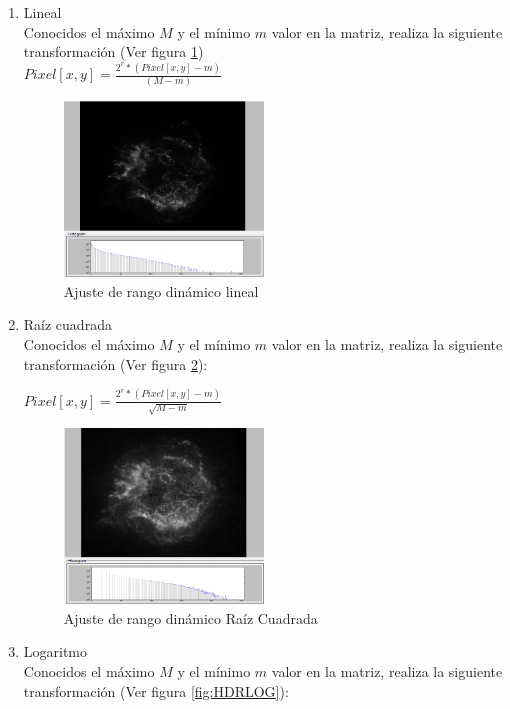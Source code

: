 	\begin{enumerate}
		\item Lineal\\
		Conocidos el máximo $M$ y el mínimo $m$ valor en la matriz, realiza
		la siguiente transformación (Ver figura \ref{fig:HDRLineal})\\
		
			$Pixel[x,y]=\frac{2^{r}*(Pixel[x,y]-m)}{(M-m)}$
			\begin{figure}[!htb]
				\centering
				\includegraphics[width=0.5\textwidth]{images/HDREQ/chandraLineal.PNG}
				\caption{\label{fig:HDRLineal}Ajuste de rango dinámico lineal}
			\end{figure}
		\item Raíz cuadrada\\
		Conocidos el máximo $M$ y el mínimo $m$ valor en la matriz, realiza
		la siguiente transformación (Ver figura \ref{fig:HDRSQRT}):
		
			$Pixel[x,y]=\frac{2^{r}*(Pixel[x,y]-m)}{\sqrt{M-m}}$
			\begin{figure}[!htb]
				\centering
				\includegraphics[width=0.5\textwidth]{images/HDREQ/chandraSqrt.PNG}
				\caption{\label{fig:HDRSQRT}Ajuste de rango dinámico Raíz Cuadrada}
			\end{figure}
		\item Logaritmo\\
		Conocidos el máximo $M$ y el mínimo $m$ valor en la matriz, realiza
		la siguiente transformación (Ver figura \ref{fig:HDRLOG}):
		

\end{enumerate}

